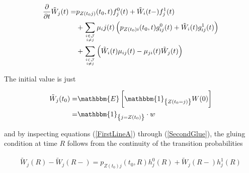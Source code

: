 \documentclass{book}
\newcommand{\1}[1]{\mathbbm{1}_{\left\lbrace #1 \right\rbrace}}
\newcommand{\expec}[1][def]{\mathbbm{E} \left[ #1 \right]}
\theoremstyle{break}
\theoremstyle{remark}
\numberwithin{equation}{section}
\begin{document}
\begin{align*}
	\frac{\partial}{\partial t} \tilde{W}_j(t) =& p_{Z(t_0j)}(t_0,t) f_j^0(t) + \tilde{W}_i(t-) f_j^1(t) \\
	&+ \sum_{i \in \mathcal{J} \atop i \neq j} \mu_ij(t) \left( p_{Z(t_0)i}(t_0,t) g_{ij}^0(t) + \tilde{W}_i(t) g_{ij}^1(t) \right) \\
	&+ \sum_{i \in \mathcal{J} \atop i \neq j} \left( \tilde{W}_i(t) \mu_{ij}(t) - \mu_{ji}(t) \tilde{W}_j(t) \right)
\end{align*}

The initial value is just

\begin{align*}
	\tilde{W}_j(t_0) =& \expec[\1{Z(t_0=j)} W(0)] \\
	=& \1{j=Z(t_0)} \cdot w
\end{align*}

and by inspecting equations (\ref{FirstLineA}) through (\ref{SecondGlue}), the gluing condition at time $R$ follows from the continuity of the transition probabilities

\begin{align*}
	\tilde{W}_j(R) - \tilde{W}_j(R-) = p_{Z(t_0)j}(t_0,R) h_j^0(R) + \tilde{W}_j(R-) h_j^1(R)
\end{align*}


\end{document}
